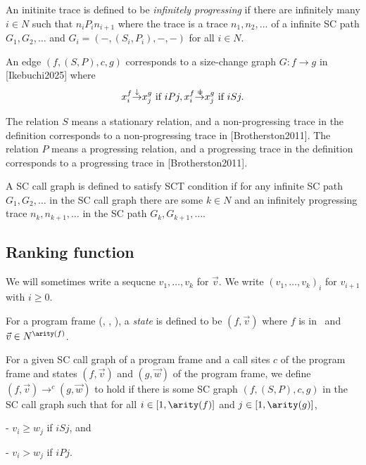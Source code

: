 \begin{Def}\rm
An initinite trace is defined to be {\em infinitely progressing}
if 
there are infinitely many $i \in N$ such that $n_i P_i n_{i+1}$
where
the trace is a trace $n_1,n_2,\ldots$ of a infinite SC path $G_1,G_2,\dots$
and
$G_i=(-,(S_i,P_i),-,-)$ for all $i \in N$.
\end{Def}


An edge $(f, (S, P), c, g)$ corresponds to
a size-change graph $G : f \to g$ in [Ikebuchi2025]
where
\[
x_i^f {\displaystyle \mathop{\to}^\downarrow} x_j^g \hbox{ if } iPj, \\
x_i^f {\displaystyle \mathop{\to}^{=\hskip -5pt\downarrow}} x_j^g \hbox{ if } iSj.
\]

The relation $S$ means a stationary relation, and
a non-progressing trace in the definition
corresponds to a non-progressing trace in [Brotherston2011].
The relation $P$ means a progressing relation, and
a progressing trace in the definition
corresponds to a progressing trace in [Brotherston2011].

\begin{Def}\rm
A SC call graph is defined to satisfy SCT condition if
for any infinite SC path $G_1,G_2,\ldots$ in the SC call graph
there are some $k \in N$ and an infinitely progressing trace $n_k,n_{k+1},\ldots$
in the SC path $G_k,G_{k+1},\ldots$.
\end{Def}

\subsection{Ranking function}

We will sometimes write a sequcne $v_1,\ldots,v_k$ for $\Vec v$.
We write $(v_1,\ldots,v_k)_i$ for $v_{i+1}$ with $i \ge 0$.

\begin{Def}[State]\rm
For a program frame (\Functionnames, \Callsitenames, \arity),
a {\em state} is defined to be $(f,\Vec v)$
where $f$ is in \Functionnames\
and $\Vec v \in N^{\arity(f)}$.

For a given SC call graph of a program frame and
a call sites $c$ of the program frame and
states $(f, \Vec v)$ and $(g, \Vec w)$ of the program frame,
we define $(f, \Vec v) \to^c (g, \Vec w)$ to hold if
there is some SC graph $(f,(S,P),c,g)$ in the SC call graph such that
for all $i \in [1,\arity(f)]$ and $j \in [1,\arity(g)]$,

- $v_i \ge w_j$ if $i S j$, and

- $v_i > w_j$ if $i P j$.
\end{Def}

